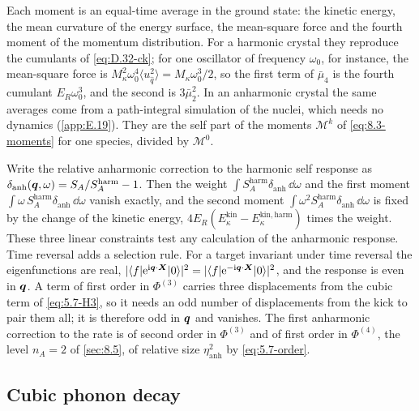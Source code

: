 \noindent Each moment is an equal-time average in the ground state: the kinetic energy, the mean curvature of the energy surface, the mean-square force and the fourth moment of the momentum distribution. For a harmonic crystal they reproduce the cumulants of \cref{eq:D.32-ck}; for one oscillator of frequency $\omega_0$, for instance, the mean-square force is $M_\kappa^2\omega_0^4\langle u_{\hat q}^2\rangle = M_\kappa\omega_0^3/2$, so the first term of $\bar\mu_4$ is the fourth cumulant $E_R\omega_0^3$, and the second is $3\bar\mu_2^2$. In an anharmonic crystal the same averages come from a path-integral simulation of the nuclei, which needs no dynamics (\cref{app:E.19}). They are the self part of the moments $\mathscr{M}^k$ of \cref{eq:8.3-moments} for one species, divided by $\mathscr{M}^0$.

Write the relative anharmonic correction to the harmonic self response as $\delta_{\mathrm{anh}}(\bm{q},\omega) = S_A/S_A^{\mathrm{harm}} - 1$. Then the weight $\int S_A^{\mathrm{harm}}\delta_{\mathrm{anh}}\,\dd\omega$ and the first moment $\int\omega\,S_A^{\mathrm{harm}}\delta_{\mathrm{anh}}\,\dd\omega$ vanish exactly, and the second moment $\int\omega^2S_A^{\mathrm{harm}}\delta_{\mathrm{anh}}\,\dd\omega$ is fixed by the change of the kinetic energy, $4E_R(E^{\mathrm{kin}}_\kappa - E^{\mathrm{kin,harm}}_\kappa)$ times the weight. These three linear constraints test any calculation of the anharmonic response. Time reversal adds a selection rule. For a target invariant under time reversal the eigenfunctions are real, $|\langle f|\mathrm{e}^{\mathrm{i}\bm{q}\cdot\bm{X}}|0\rangle|^2 = |\langle f|\mathrm{e}^{-\mathrm{i}\bm{q}\cdot\bm{X}}|0\rangle|^2$, and the response is even in $\bm{q}$. A term of first order in $\Phi^{(3)}$ carries three displacements from the cubic term of \cref{eq:5.7-H3}, so it needs an odd number of displacements from the kick to pair them all; it is therefore odd in $\bm{q}$ and vanishes. The first anharmonic correction to the rate is of second order in $\Phi^{(3)}$ and of first order in $\Phi^{(4)}$, the level $n_A = 2$ of \cref{sec:8.5}, of relative size $\eta_{\mathrm{anh}}^2$ by \cref{eq:5.7-order}.

\subsection{Cubic phonon decay}

